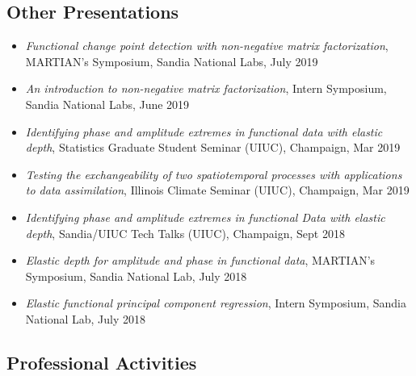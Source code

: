 \documentclass[11pt]{article}
\begin{document}
\subsection*{Other Presentations}
\vspace{-0.6cm}\noindent\hrulefill
\vspace{-0.2cm}

\begin{itemize}[leftmargin=*,label={}]
    \setlength\itemsep{0.45em}
    
    \item \textit{Functional change point detection with non-negative matrix factorization}, MARTIAN's Symposium, Sandia National Labs, July 2019
    
    \item \textit{An introduction to non-negative matrix factorization}, Intern Symposium, Sandia National Labs, June 2019
    
    \item \textit{Identifying phase and amplitude extremes in functional data with elastic depth}, Statistics Graduate Student Seminar (UIUC), Champaign, Mar 2019 
    
    \item \textit{Testing the exchangeability of two spatiotemporal processes with applications to data assimilation}, Illinois Climate Seminar (UIUC), Champaign, Mar 2019 
    
    \item \textit{Identifying phase and amplitude extremes in functional Data with elastic depth}, Sandia/UIUC Tech Talks (UIUC), Champaign, Sept 2018 
    
    \item \textit{Elastic depth for amplitude and phase in functional data}, MARTIAN's Symposium, Sandia National Lab, July 2018
    
    \item \textit{Elastic functional principal component regression}, Intern Symposium, Sandia National Lab, July 2018
\end{itemize}



\subsection*{Professional Activities}
\vspace{-0.6cm}\noindent\hrulefill
\vspace{0.1cm}
\end{document}
